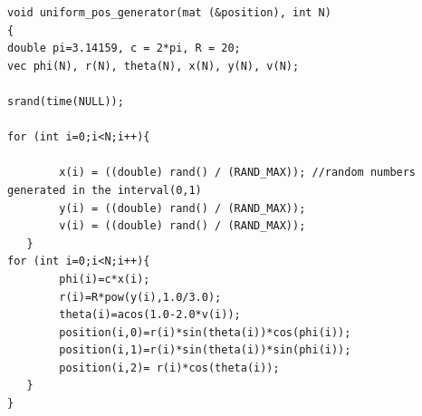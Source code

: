 \begin{lstlisting}
void uniform_pos_generator(mat (&position), int N)
{
double pi=3.14159, c = 2*pi, R = 20;
vec phi(N), r(N), theta(N), x(N), y(N), v(N);

srand(time(NULL));

for (int i=0;i<N;i++){

        x(i) = ((double) rand() / (RAND_MAX)); //random numbers generated in the interval(0,1)
        y(i) = ((double) rand() / (RAND_MAX));
        v(i) = ((double) rand() / (RAND_MAX));
   }
for (int i=0;i<N;i++){
        phi(i)=c*x(i);
        r(i)=R*pow(y(i),1.0/3.0);
        theta(i)=acos(1.0-2.0*v(i));
        position(i,0)=r(i)*sin(theta(i))*cos(phi(i));
        position(i,1)=r(i)*sin(theta(i))*sin(phi(i));
        position(i,2)= r(i)*cos(theta(i));
   }
}
\end{lstlisting}

